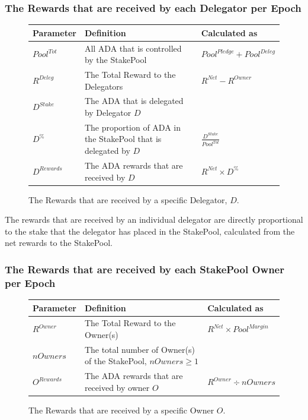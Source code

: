 \documentclass[11pt,a4paper,dvipsnames,twosided,final]{article}
\newcommand{\ada}{ADA{}}
\begin{document}
\subsubsection*{The Rewards that are received by each Delegator per Epoch}

\begin{figure}[h!]
\begin{center}
\begin{tabular}{||l|p{9cm}|l||}
  \hline \hline
\textbf{Parameter} & \textbf{Definition} & \textbf{Calculated as} \\\hline
${\textit{Pool}}^{Tot}$ & All \ada{} that is controlled by the StakePool & ${\textit{Pool}}^\textit{Pledge} + {\textit{Pool}}^\textit{Deleg}$ \\\hline
$R^{Deleg}$ & The Total Reward to the Delegators & $R^{\textit{Net}} - R^\textit{Owner}$ \\\hline
$D^{Stake}$ & The \ada{} that is delegated by Delegator $D$ & \\\hline
$D^\%$ & The proportion of \ada{} in the StakePool that is delegated by $D$ & $\frac{D^{Stake}}{Pool^{Tot}}$ \\\hline
$D^{Rewards}$ & The \ada{} rewards that are received by $D$ & $R^{\textit{Net}} \times D^\%$ \\\hline
\hline
\end{tabular}
\end{center}
\caption{The Rewards that are received by a specific Delegator, $D$.}
\end{figure}

\noindent
The rewards that are received by an individual delegator are directly proportional to the
stake that the delegator has placed in the StakePool, calculated from the net rewards to the
StakePool.

\clearpage
\subsubsection*{The Rewards that are received by each StakePool Owner per Epoch}

\begin{figure}[h!]
\begin{center}
\begin{tabular}{||l|p{6cm}|l||}
  \hline \hline
\textbf{Parameter}  & \textbf{Definition} & \textbf{Calculated as} \\\hline
$R^\textit{Owner}$ & The Total Reward to the Owner(s) & $R^{\textit{Net}} \times {\textit{Pool}}^{\textit{Margin}} $ \\\hline
$\textit{nOwners}$ & The total number of Owner(s) of the StakePool, $\textit{nOwners} \ge 1$  & \\\hline
$O^{Rewards}$ & The \ada{} rewards that are received by owner $O$ & $R^\textit{Owner} \div \textit{nOwners}$ \\\hline
\hline
\end{tabular}
\end{center}
\caption{The Rewards that are received by a specific Owner $O$.}
\end{figure}
\end{document}
